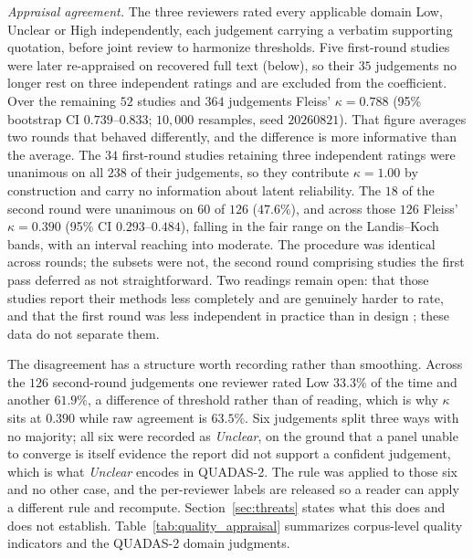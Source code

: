 \documentclass[review,authoryear]{elsarticle}
\begin{document}
\emph{Appraisal agreement.} The three reviewers rated every applicable domain Low,
Unclear or High independently, each judgement carrying a verbatim supporting quotation,
before joint review to harmonize thresholds. Five first-round studies were later
re-appraised on recovered full text (below), so their $35$ judgements no longer rest on
three independent ratings and are excluded from the coefficient. Over the remaining $52$
studies and $364$ judgements Fleiss' $\kappa = 0.788$ (95\% bootstrap CI
$0.739$--$0.833$; $10{,}000$ resamples, seed $20260821$). That figure averages two rounds
that behaved differently, and the difference is more informative than the average. The
$34$ first-round studies retaining three independent ratings were unanimous on all $238$
of their judgements, so they contribute $\kappa = 1.00$ by construction and carry no
information about latent reliability. The $18$ of the second round were unanimous on $60$
of $126$ ($47.6\%$), and across those $126$ Fleiss' $\kappa = 0.390$ (95\% CI
$0.293$--$0.484$), falling in the fair range on the Landis--Koch bands, with an interval reaching into
moderate. The procedure was identical across rounds; the subsets were not, the second
round comprising studies the first pass deferred as not straightforward. Two readings
remain open: that those studies report their methods less completely and are genuinely
harder to rate, and that the first round was less independent in practice than in design
; these data do not separate them.

The disagreement has a structure worth recording rather than smoothing. Across the $126$
second-round judgements one reviewer rated Low $33.3\%$ of the time and another $61.9\%$,
a difference of threshold rather than of reading, which is why $\kappa$ sits at $0.390$
while raw agreement is $63.5\%$. Six judgements split three ways with no majority; all six
were recorded as \emph{Unclear}, on the ground that a panel unable to converge is itself
evidence the report did not support a confident judgement, which is what \emph{Unclear}
encodes in QUADAS-2. The rule was applied to those six and no other case, and the
per-reviewer labels are released so a reader can apply a different rule and recompute.
Section~\ref{sec:threats} states what this does and does not establish.
Table~\ref{tab:quality_appraisal} summarizes corpus-level quality indicators and the
QUADAS-2 domain judgments.
\end{document}
